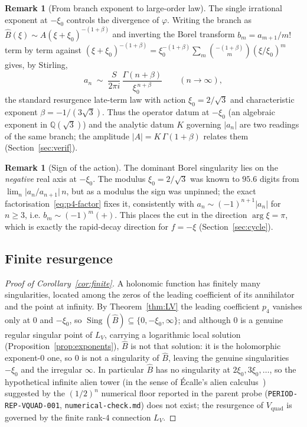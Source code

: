 \documentclass[11pt,reqno]{amsart}
\renewcommand{\_}{\vquadorigunderscore\allowbreak}
\theoremstyle{plain}
\theoremstyle{definition}
\newtheorem{remark}[theorem]{Remark}
\newcommand{\Vquad}{V_{\mathrm{quad}}}
\newcommand{\Bhat}{\widehat{B}}
\newcommand{\LV}{L_{V}}
\newcommand{\Qsqrt}{\mathbb{Q}(\sqrt3)}
\newcommand{\xizero}{\xi_0}
\begin{document}
\begin{remark}[From branch exponent to large-order law]\label{rmk:largeorder}
The single irrational exponent at $-\xizero$ controls the divergence of $\varphi$. Writing the
branch as $\Bhat(\xi)\sim A(\xi+\xizero)^{-(1+\beta)}$ and inverting the Borel transform
$b_m=a_{m+1}/m!$ term by term against $(\xi+\xizero)^{-(1+\beta)}=\xizero^{-(1+\beta)}\sum_m
\binom{-(1+\beta)}{m}(\xi/\xizero)^m$ gives, by Stirling,
\begin{equation}\label{eq:largeorder}
  a_n\;\sim\;\frac{S}{2\pi i}\,\frac{\Gamma(n+\beta)}{\xizero^{\,n+\beta}}\qquad(n\to\infty),
\end{equation}
the standard resurgence late-term law with action $\xizero=2/\sqrt3$ and characteristic exponent
$\beta=-1/(3\sqrt3)$. Thus the operator datum at $-\xizero$ (an algebraic exponent in $\Qsqrt$)
and the analytic datum $K$ governing $\lvert a_n\rvert$ are two readings of the same branch; the
amplitude $\lvert A\rvert=K\,\Gamma(1+\beta)$ relates them (Section~\ref{sec:verif}).
\end{remark}

\begin{remark}[Sign of the action]
The dominant Borel singularity lies on the \emph{negative} real axis at $-\xizero$. The modulus
$\xizero=2/\sqrt3$ was known to $95.6$ digits from $\lim_n\lvert a_n/a_{n+1}\rvert\,n$, but as a
modulus the sign was unpinned; the exact factorisation~\eqref{eq:p4-factor} fixes it, consistently
with $a_n\sim(-1)^{n+1}\lvert a_n\rvert$ for $n\ge3$, i.e. $b_m\sim(-1)^m(+)$. This places the cut
in the direction $\arg\xi=\pi$, which is exactly the rapid-decay direction for $f=-\xi$
(Section~\ref{sec:cycle}).
\end{remark}

\subsection{Finite resurgence}
\begin{proof}[Proof of Corollary~\ref{cor:finite}]
A holonomic function has finitely many singularities, located among the zeros of the leading
coefficient of its annihilator and the point at infinity. By Theorem~\ref{thm:LV} the leading
coefficient $p_4$ vanishes only at $0$ and $-\xizero$, so
$\operatorname{Sing}(\Bhat)\subseteq\{0,-\xizero,\infty\}$; and although $0$ is a genuine regular
singular point of $\LV$, carrying a logarithmic local solution
(Proposition~\ref{prop:exponents}), $\Bhat$ is not that solution: it is the holomorphic
exponent-$0$ one, so $0$ is not a singularity of $\Bhat$, leaving the genuine singularities
$-\xizero$ and the
irregular $\infty$. In particular $\Bhat$ has no singularity at $2\xizero,3\xizero,\dots$, so the
hypothetical infinite alien tower (in the sense of \'Ecalle's alien calculus~\cite{Ecalle})
suggested by the $(1/2)^n$ numerical floor reported in the parent probe
(\texttt{PERIOD-REP-VQUAD-001}, \texttt{numerical-check.md})
does not exist; the resurgence of $\Vquad$ is governed by the finite rank-$4$ connection $\LV$.
\end{proof}
\end{document}
